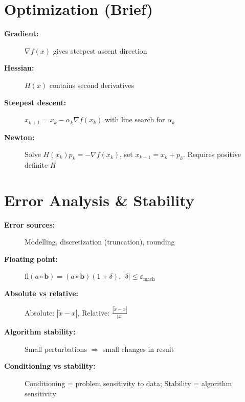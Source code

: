 \documentclass[a4paper,10pt,landscape]{article}
\begin{document}
\begin{multicols*}{3}
    \section*{Optimization (Brief)}
    \begin{description}
        \item[\textbf{Gradient:}] $\nabla f(x)$ gives steepest ascent direction
        \item[\textbf{Hessian:}] $H(x)$ contains second derivatives
        \item[\textbf{Steepest descent:}] $x_{k+1} = x_k - \alpha_k \nabla f(x_k)$ with line search for $\alpha_k$
        \item[\textbf{Newton:}] Solve $H(x_k)p_k = -\nabla f(x_k)$, set $x_{k+1} = x_k + p_k$. Requires positive definite $H$
    \end{description}

    \section*{Error Analysis \& Stability}
    \begin{description}
        \item[\textbf{Error sources:}] Modelling, discretization (truncation), rounding
        \item[\textbf{Floating point:}] $\text{fl}(a \circ \mathbf{b}) = (a \circ \mathbf{b})(1+\delta)$, $|\delta| \leq \varepsilon_{\text{mach}}$
        \item[\textbf{Absolute vs relative:}] Absolute: $|\tilde{x}-x|$, Relative: $\frac{|\tilde{x}-x|}{|x|}$
        \item[\textbf{Algorithm stability:}] Small perturbations $\Rightarrow$ small changes in result
        \item[\textbf{Conditioning vs stability:}] Conditioning = problem sensitivity to data; Stability = algorithm sensitivity
    \end{description}
\end{multicols*}
\end{document}
